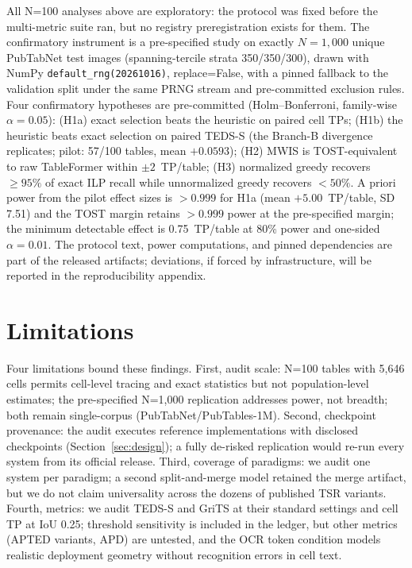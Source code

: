 \documentclass[final,5p,times,twocolumn]{elsarticle}
\begin{document}
All N=100 analyses above are exploratory: the protocol was fixed before the
multi-metric suite ran, but no registry preregistration exists for them. The
confirmatory instrument is a pre-specified study on exactly $N{=}1{,}000$
unique PubTabNet test images (spanning-tercile strata 350/350/300), drawn with
NumPy \texttt{default\_\allowbreak rng(20261016)}, replace=False, with a pinned fallback
to the validation split under the same PRNG stream and pre-committed exclusion
rules.
Four confirmatory hypotheses are pre-committed (Holm--Bonferroni, family-wise
$\alpha{=}0.05$): (H1a) exact selection beats the heuristic on
paired cell TPs; (H1b) the heuristic beats exact selection on paired TEDS-S
(the Branch-B divergence replicates; pilot: 57/100 tables, mean
$+0.0593$); (H2) MWIS is TOST-equivalent to raw
TableFormer within $\pm2$~TP/table; (H3) normalized greedy recovers $\geq
95\%$ of exact ILP recall while unnormalized greedy recovers $<50\%$. A priori
power from the pilot effect sizes is $>0.999$ for H1a (mean $+5.00$~TP/table,
SD 7.51) and the TOST margin retains $>0.999$ power at the pre-specified
margin; the minimum detectable effect is 0.75~TP/table at 80\% power and
one-sided $\alpha{=}0.01$. The protocol text, power computations, and pinned
dependencies are part of the released artifacts; deviations, if forced by
infrastructure, will be reported in the reproducibility appendix.

\section{Limitations}\label{sec:limits}

Four limitations bound these findings. First, audit scale: N=100 tables with
5{,}646 cells permits cell-level tracing and exact statistics but not
population-level estimates; the pre-specified N=1{,}000 replication addresses
power, not breadth; both remain single-corpus (PubTabNet/PubTables-1M).
Second, checkpoint provenance: the audit executes reference implementations
with disclosed checkpoints (Section~\ref{sec:design}); a fully de-risked
replication would re-run every system from its official release. Third, coverage of paradigms: we audit one system per paradigm; a second
split-and-merge model retained the merge artifact, but we do not claim
universality across the dozens of published TSR variants. Fourth,
metrics: we audit TEDS-S and GriTS at their standard settings and cell TP at
IoU 0.25; threshold sensitivity is included in the ledger, but other metrics
(APTED variants, APD) are untested, and the OCR token condition models
realistic deployment geometry without recognition errors in cell text.
\end{document}
